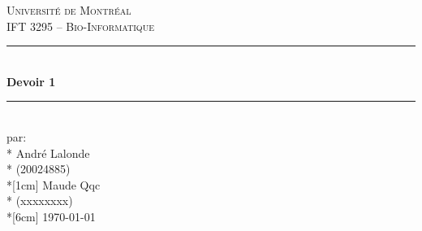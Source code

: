 \documentclass[11pt, letterpaper]{article}
\begin{document}
\begin{titlepage}
\center

\vspace*{2cm}

\textsc{\LARGE Université de Montréal}\\[1cm] 
\textsc{\Large IFT 3295 -- Bio-Informatique}\\[1.5cm] 

\rule{\linewidth}{0.5mm} \\[0.5cm]
{\LARGE \bfseries Devoir 1} \\[0.2cm] %
\rule{\linewidth}{0.5mm} \\[3cm]
 
\large par: \\*
André Lalonde \\* %
(20024885) \\*[1cm] %
Maude Qqc \\*
(xxxxxxxx) \\*[6cm]
{\large \today}\\[2cm]

\vfill
\end{titlepage}
\newpage
\flushleft
\end{document}
